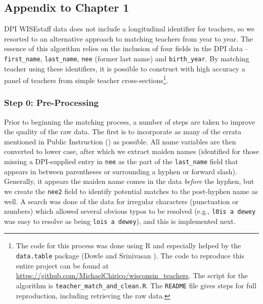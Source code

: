 \begin{appendices}
    \makeatletter

\chapter{Appendix to Chapter 1}


DPI WISEstaff data does not include a longitudinal identifier for
teachers, so we resorted to an alternative approach to matching teachers
from year to year. The essence of this algorithm relies on the inclusion
of four fields in the DPI data -- \texttt{first\_name},
\texttt{last\_name}, \texttt{nee} (former last name) and
\texttt{birth\_year}. By matching teacher using these identifiers, it is
possible to construct with high accuracy a panel of teachers from simple
teacher cross-sections\footnote{The code for this process was done using
  R and especially helped by the \texttt{data.table} package (Dowle and
  Srinivasan \citeyear{dowle}). The code to reproduce
  this entire project can be found at
  \url{https://github.com/MichaelChirico/wisconsin_teachers}. The script
  for the algorithm is \texttt{teacher\_match\_and\_clean.R}. The
  \texttt{README} file gives steps for full reproduction, including
  retrieving the raw data.}.

\subsection{Step 0: Pre-Processing}\label{step-0-pre-processing}

Prior to beginning the matching process, a number of steps are taken to
improve the quality of the raw data. The first is to incorporate as many
of the errata mentioned in Public Instruction
(\citeyear{dpi_errata})
as possible. All name variables are then converted to lower case, after
which we extract maiden names (identified for those missing a
DPI-supplied entry in \texttt{nee} as the part of the
\texttt{last\_name} field that appears in between parentheses or
surrounding a hyphen or forward slash). Generally, it appears the maiden
name comes in the data \emph{before} the hyphen, but we create the
\texttt{nee2} field to identify potential matches to the post-hyphen
name as well. A search was done of the data for irregular characters
(punctuation or numbers) which allowed several obvious typos to be
resolved (e.g., \texttt{l0is\ a\ dewey} was easy to resolve as being
\texttt{lois\ a\ dewey}), and this is implemented next.


\end{appendices}
